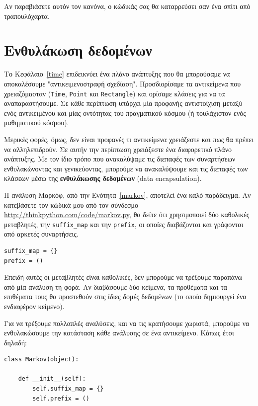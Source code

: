 \documentclass[10pt]{book}
\begin{document}
Αν παραβιάσετε αυτόν τον κανόνα, ο κώδικάς σας θα καταρρεύσει σαν ένα σπίτι από 
τραπουλόχαρτα.



\section{Ενθυλάκωση δεδομένων}

Το Κεφάλαιο~\ref{time} επιδεικνύει ένα πλάνο ανάπτυξης που θα μπορούσαμε 
να αποκαλέσουμε "αντικειμενοστραφή σχεδίαση".  Προσδιορίσαμε τα αντικείμενα 
που χρειαζόμασταν ({\tt Time}, {\tt Point} και {\tt Rectangle}) και ορίσαμε 
κλάσεις για να τα αναπαραστήσουμε.  Σε κάθε περίπτωση υπάρχει μία προφανής αντιστοίχιση 
μεταξύ ενός αντικειμένου και μίας οντότητας του πραγματικού κόσμου (ή τουλάχιστον ενός
μαθηματικού κόσμου).

Μερικές φορές, όμως, δεν είναι προφανές τι αντικείμενα χρειάζεστε και πως θα πρέπει να 
αλληλεπιδρούν.  Σε αυτήν την περίπτωση χρειάζεστε ένα διαφορετικό πλάνο ανάπτυξης.  Με 
τον ίδιο τρόπο που ανακαλύψαμε τις διεπαφές των συναρτήσεων ενθυλακώνοντας και 
γενικεύοντας, μπορούμε να ανακαλύψουμε και τις διεπαφές των κλάσεων μέσω της {\bf ενθυλάκωσης
δεδομένων} (data encapsulation).

Η ανάλυση Μαρκόφ, από την Ενότητα~\ref{markov}, αποτελεί ένα καλό παράδειγμα.
Αν κατεβάσετε τον κώδικά μου από τον σύνδεσμο \url{http://thinkpython.com/code/markov.py},
θα δείτε ότι χρησιμοποιεί δύο καθολικές μεταβλητές, την \verb"suffix_map" και την \verb"prefix",
οι οποίες διαβάζονται και γράφονται από αρκετές συναρτήσεις. 

\begin{verbatim}
suffix_map = {}
prefix = ()
\end{verbatim}

Επειδή αυτές οι μεταβλητές είναι καθολικές, δεν μπορούμε να τρέξουμε παραπάνω από μία ανάλυση
τη φορά. Αν διαβάσουμε δύο κείμενα, τα προθέματα και τα επιθέματα τους θα προστεθούν στις ίδιες 
δομές δεδομένων (το οποίο δημιουργεί ένα ενδιαφέρον κείμενο).

Για να τρέξουμε πολλαπλές αναλύσεις, και να τις κρατήσουμε χωριστά, μπορούμε να ενθυλακώσουμε την κατάσταση κάθε ανάλυσης σε ένα αντικείμενο. Κάπως έτσι δηλαδή:

\begin{verbatim}
class Markov(object):

    def __init__(self):
        self.suffix_map = {}
        self.prefix = ()
\end{verbatim}
\end{document}
